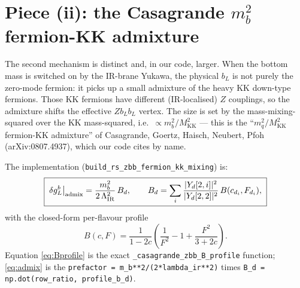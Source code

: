 \documentclass[11pt]{article}
\newcommand{\MKK}{M_{\mathrm{KK}}}
\newcommand{\LIR}{\Lambda_{\mathrm{IR}}}
\newcommand{\code}[1]{\texttt{#1}}
\newcommand{\dgL}{\delta g_L^b}
\theoremstyle{definition}
\begin{document}
\section{Piece (ii): the Casagrande $m_b^2$ fermion-KK admixture}
\label{sec:admixture}

The second mechanism is distinct and, in our code, larger. When the bottom mass
is switched on by the IR-brane Yukawa, the physical $b_L$ is not purely the
zero-mode fermion: it picks up a small admixture of the heavy KK down-type
fermions. Those KK fermions have different (IR-localised) $Z$ couplings, so the
admixture shifts the effective $Zb_Lb_L$ vertex. The size is set by the
mass-mixing-squared over the KK mass-squared, i.e.\ $\propto m_b^2/\MKK^2$ ---
this is the ``$m_q^2/\MKK^2$ fermion-KK admixture'' of Casagrande, Goertz,
Haisch, Neubert, Pfoh (arXiv:0807.4937), which our code cites by name.

The implementation (\code{build\_rs\_zbb\_fermion\_kk\_mixing}) is:
\begin{equation}
\boxed{\;\dgL\big|_{\rm admix} = \frac{m_b^2}{2\,\LIR^2}\,B_d,
\qquad
B_d = \sum_{i} \frac{|Y_d[2,i]|^2}{|Y_d[2,2]|^2}\,B(c_{d_i}, F_{d_i}),\;}
\label{eq:admix}
\end{equation}
with the closed-form per-flavour profile
\begin{equation}
B(c, F) = \frac{1}{1-2c}\left(\frac{1}{F^2} - 1 + \frac{F^2}{3+2c}\right).
\label{eq:Bprofile}
\end{equation}
Equation \eqref{eq:Bprofile} is the exact
\code{\_casagrande\_zbb\_B\_profile} function; \eqref{eq:admix} is the
\code{prefactor = m\_b**2/(2*lambda\_ir**2)} times \code{B\_d = np.dot(row\_ratio,
profile\_b\_d)}.
\end{document}
